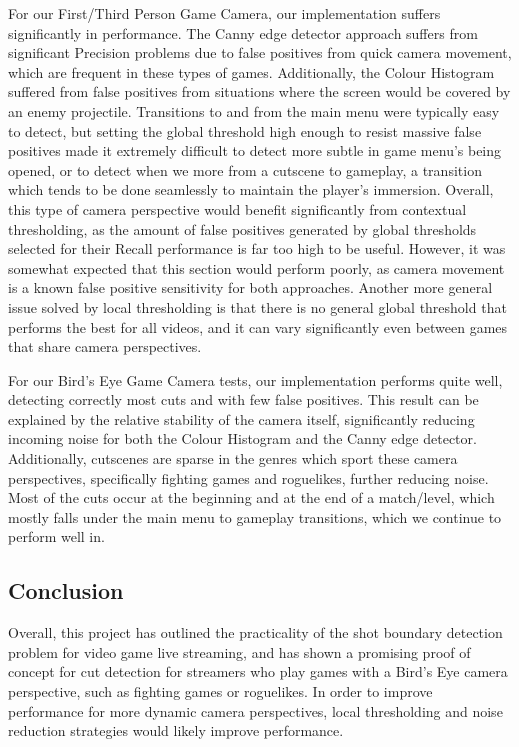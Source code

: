 \documentclass[12pt]{article}
\begin{document}
For our First/Third Person Game Camera, our implementation suffers significantly in performance. The Canny edge detector approach suffers from significant Precision problems 
due to false positives from quick camera movement, which are frequent in these types of games. Additionally, the Colour Histogram suffered from false positives from situations
where the screen would be covered by an enemy projectile. Transitions to and from the main menu were typically easy to detect, but setting the global threshold high enough to 
resist massive false positives made it extremely difficult to detect more subtle in game menu's being opened, or to detect when we more from a cutscene to gameplay, a transition
which tends to be done seamlessly to maintain the player's immersion. Overall, this type of camera perspective would benefit significantly from contextual thresholding, as the amount of false 
positives generated by global thresholds selected for their Recall performance is far too high to be useful. However, it was somewhat expected that this section would perform
poorly, as camera movement is a known false positive sensitivity for both approaches. Another more general issue solved by local thresholding is that there is no general 
global threshold that performs the best for all videos, and it can vary significantly even between games that share camera perspectives.

For our Bird's Eye Game Camera tests, our implementation performs quite well, detecting correctly most cuts and with few false positives. This result can be explained by the 
relative stability of the camera itself, significantly reducing incoming noise for both the Colour Histogram and the Canny edge detector. Additionally, cutscenes are sparse
in the genres which sport these camera perspectives, specifically fighting games and roguelikes, further reducing noise. Most of the cuts occur at the beginning and at the end 
of a match/level, which mostly falls under the main menu to gameplay transitions, which we continue to perform well in.
\subsection{Conclusion}
Overall, this project has outlined the practicality of the shot boundary detection problem for video game live streaming, and has 
shown a promising proof of concept for cut detection for streamers who play games with a Bird's Eye camera perspective, such as fighting games or 
roguelikes. In order to improve performance for more dynamic camera perspectives, local thresholding and noise reduction strategies would likely improve performance.
\clearpage

{}

\clearpage
\end{document}
